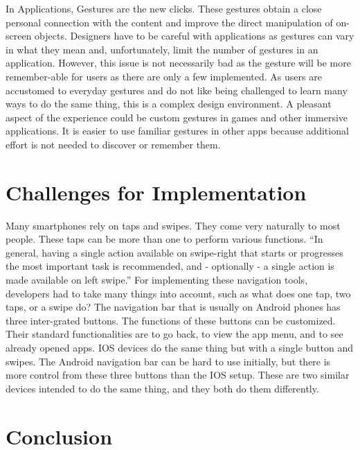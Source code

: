\documentclass{article}
\begin{document}
In Applications, Gestures are the new clicks. These gestures obtain a close personal connection with the content and improve the direct manipulation of on-screen objects. Designers have to be careful with applications as gestures can vary in what they mean and, unfortunately, limit the number of gestures in an application. However, this issue is not necessarily bad as the gesture will be more remember-able for users as there are only a few implemented. As users are accustomed to everyday gestures and do not like being challenged to learn many ways to do the same thing, this is a complex design environment. A pleasant aspect of the experience could be custom gestures in games and other immersive applications. It is easier to use familiar gestures in other apps because additional effort is not needed to discover or remember them.
\cite{ref15}

\section{Challenges for Implementation}

Many smartphones rely on taps and swipes. They come very naturally to most people. These taps can be more than one to perform various functions. “In general, having a single action available on swipe-right that starts or progresses the most important task is recommended, and - optionally - a single action is made available on left swipe.”
\cite{ref16}
For implementing these navigation tools, developers had to take many things into account, such as what does one tap, two taps, or a swipe do? The navigation bar that is usually on Android phones has three inter-grated buttons. The functions of these buttons can be customized. Their standard functionalities are to go back, to view the app menu, and to see already opened apps. IOS devices do the same thing but with a single button and swipes. The Android navigation bar can be hard to use initially, but there is more control from these three buttons than the IOS setup. These are two similar devices intended to do the same thing, and they both do them differently.

\section{Conclusion}
\end{document}
